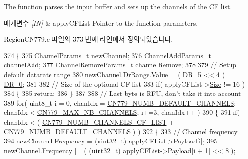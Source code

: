 The function parses the input buffer and sets up the channels of the CF list. 


\begin{DoxyParams}{매개변수}
{\em \mbox{[}\+I\+N\mbox{]}} & apply\+C\+F\+List Pointer to the function parameters. \\
\hline
\end{DoxyParams}


Region\+C\+N779.\+c 파일의 373 번째 라인에서 정의되었습니다.


\begin{DoxyCode}
374 \{
375     \mbox{\hyperlink{structs_channel_params}{ChannelParams\_t}} newChannel;
376     \mbox{\hyperlink{structs_channel_add_params}{ChannelAddParams\_t}} channelAdd;
377     \mbox{\hyperlink{structs_channel_remove_params}{ChannelRemoveParams\_t}} channelRemove;
378 
379     \textcolor{comment}{// Setup default datarate range}
380     newChannel.\mbox{\hyperlink{structs_channel_params_ad4d9b041ea740886a05fa8a1d06997a2}{DrRange}}.\mbox{\hyperlink{unionu_dr_range_ae1e3e8696366e3256e397bbdc4e34775}{Value}} = ( \mbox{\hyperlink{group___r_e_g_i_o_n_ga872e12c82020c02a7f70a1c6ed1375df}{DR\_5}} << 4 ) | \mbox{\hyperlink{group___r_e_g_i_o_n_ga6c4ef966b4f3d5eb7597b087f2b97095}{DR\_0}};
381 
382     \textcolor{comment}{// Size of the optional CF list}
383     \textcolor{keywordflow}{if}( applyCFList->\mbox{\hyperlink{structs_apply_c_f_list_params_ace31de7598e85e87624c4e7d8e5d112c}{Size}} != 16 )
384     \{
385         \textcolor{keywordflow}{return};
386     \}
387 
388     \textcolor{comment}{// Last byte is RFU, don't take it into account}
389     \textcolor{keywordflow}{for}( uint8\_t i = 0, chanIdx = \mbox{\hyperlink{group___r_e_g_i_o_n_c_n779_ga03a2c79e3c0f039e5f1150e4d9fdfa1a}{CN779\_NUMB\_DEFAULT\_CHANNELS}}; chanIdx < 
      \mbox{\hyperlink{group___r_e_g_i_o_n_c_n779_gaa23230e648a8147840e88f03f9d3b7fc}{CN779\_MAX\_NB\_CHANNELS}}; i+=3, chanIdx++ )
390     \{
391         \textcolor{keywordflow}{if}( chanIdx < ( \mbox{\hyperlink{group___r_e_g_i_o_n_c_n779_ga89f42e14e70be48170465e9cdd74caeb}{CN779\_NUMB\_CHANNELS\_CF\_LIST}} + 
      \mbox{\hyperlink{group___r_e_g_i_o_n_c_n779_ga03a2c79e3c0f039e5f1150e4d9fdfa1a}{CN779\_NUMB\_DEFAULT\_CHANNELS}} ) )
392         \{
393             \textcolor{comment}{// Channel frequency}
394             newChannel.\mbox{\hyperlink{structs_channel_params_ade3d190636488dad9a89b19446b7acf1}{Frequency}} = (uint32\_t) applyCFList->\mbox{\hyperlink{structs_apply_c_f_list_params_a3dfbfe76c8f3bd25765750487b815147}{Payload}}[i];
395             newChannel.\mbox{\hyperlink{structs_channel_params_ade3d190636488dad9a89b19446b7acf1}{Frequency}} |= ( (uint32\_t) applyCFList->\mbox{\hyperlink{structs_apply_c_f_list_params_a3dfbfe76c8f3bd25765750487b815147}{Payload}}[i + 1] << 8 );

\end{DoxyCode}
